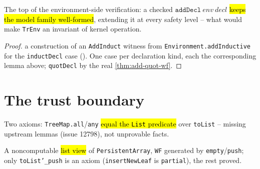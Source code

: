 \begin{theorem}
\label{thm:add-decl-wf}
\leanok
{}

 The top of the environment-side verification: a checked
$\mathtt{addDecl}\ env\ decl$ \hl{keeps the model family well-formed}, extending it at
every safety level -- what would make \texttt{TrEnv} an invariant of kernel operation.
\end{theorem}
\begin{proof}
\stSorry{}  a construction of an \texttt{AddInduct} witness from
\texttt{Environment.addInductive} for the \texttt{inductDecl} case
().
 One case per declaration kind, each the corresponding lemma above;
\texttt{quotDecl} by the real \ref{thm:add-quot-wf}.
\end{proof}

\section{The trust boundary}

\begin{definition}
\label{family:treemap-axioms}
\leanok
{}

 Two axioms: \texttt{TreeMap.all}/\texttt{any} \hl{equal the \texttt{List}
predicate} over \texttt{toList} -- missing upstream lemmas (issue 12798), not unprovable
facts.
\end{definition}

\begin{definition}
\label{family:persistent-array-axioms}
\leanok
{}

 A noncomputable \hl{list view} of \texttt{PersistentArray}, \texttt{WF}
generated by \texttt{empty}/\texttt{push}; only \texttt{toList'\_push} is an axiom
(\texttt{insertNewLeaf} is \texttt{partial}), the rest proved.
\end{definition}

